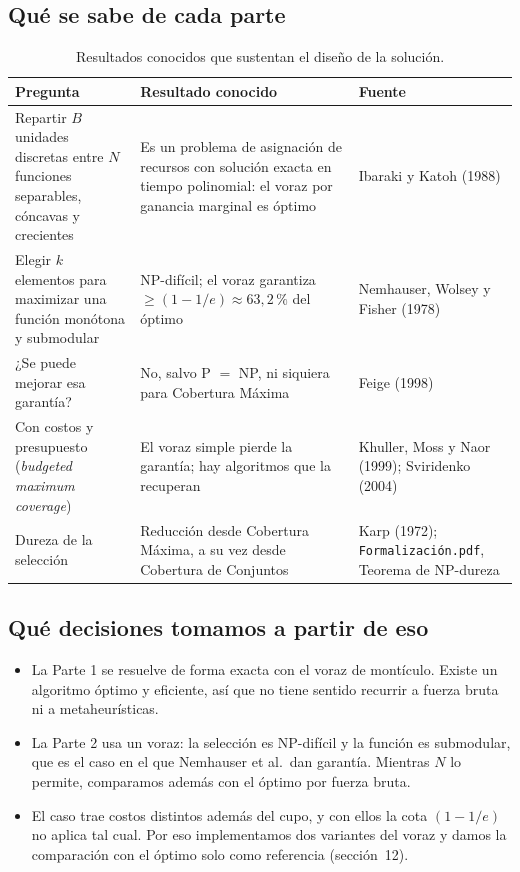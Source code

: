\documentclass[11pt,a4paper]{article}
\begin{document}
\subsection{Qué se sabe de cada parte}

\begin{table}[htbp]
\centering
\small
\renewcommand{\arraystretch}{1.2}
\begin{tabularx}{\textwidth}{@{}>{\raggedright\arraybackslash}p{4.6cm}>{\raggedright\arraybackslash}X>{\raggedright\arraybackslash}p{3.6cm}@{}}
\toprule
Pregunta & Resultado conocido & Fuente \\
\midrule
Repartir $B$ unidades discretas entre $N$ funciones separables, cóncavas y
crecientes &
Es un problema de asignación de recursos con solución exacta en tiempo
polinomial: el voraz por ganancia marginal es óptimo &
Ibaraki y Katoh (1988) \\
\addlinespace
Elegir $k$ elementos para maximizar una función monótona y submodular &
NP-difícil; el voraz garantiza $\ge(1-1/e)\approx63{,}2\,\%$ del óptimo &
Nemhauser, Wolsey y Fisher (1978) \\
\addlinespace
¿Se puede mejorar esa garantía? &
No, salvo P $=$ NP, ni siquiera para Cobertura Máxima &
Feige (1998) \\
\addlinespace
Con costos y presupuesto (\emph{budgeted maximum coverage}) &
El voraz simple pierde la garantía; hay algoritmos que la recuperan &
Khuller, Moss y Naor (1999); Sviridenko (2004) \\
\addlinespace
Dureza de la selección &
Reducción desde Cobertura Máxima, a su vez desde Cobertura de Conjuntos &
Karp (1972); \texttt{Formalización.pdf}, Teorema de NP-dureza \\
\bottomrule
\end{tabularx}
\caption{Resultados conocidos que sustentan el diseño de la solución.}
\end{table}

\subsection{Qué decisiones tomamos a partir de eso}

\begin{itemize}[leftmargin=*,label=$\bullet$]
  \item La Parte 1 se resuelve de forma exacta con el voraz de montículo.
  Existe un algoritmo óptimo y eficiente, así que no tiene sentido recurrir a
  fuerza bruta ni a metaheurísticas.
  \item La Parte 2 usa un voraz: la selección es NP-difícil y la función es
  submodular, que es el caso en el que Nemhauser et al.\ dan garantía.
  Mientras $N$ lo permite, comparamos además con el óptimo por fuerza bruta.
  \item El caso trae costos distintos además del cupo, y con ellos la cota
  $(1-1/e)$ no aplica tal cual. Por eso implementamos dos variantes del voraz
  y damos la comparación con el óptimo solo como referencia (sección~12).
\end{itemize}
\end{document}
